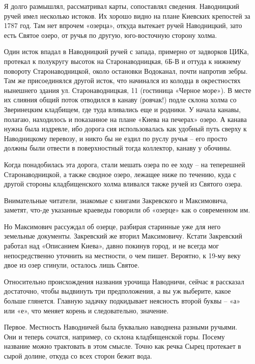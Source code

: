 Я долго размышлял, рассматривал карты, сопоставлял сведения. Наводницкий ручей имел несколько истоков. Их хорошо видно на плане Киевских крепостей за 1787 год. Там нет впрочем «озерца», откуда вытекает ручей Наводницкий, зато есть Святое озеро, от ручья по другую, юго-восточную сторону холма.

Один исток впадал в Наводницкий ручей с запада, примерно от задворков ЦИКа, протекал к полукругу высоток на Старонаводницкая, 6Б-В и оттуда к нижнему повороту Старонаводницкой, около остановки Водоканал, почти напротив зебры. Там же присоединялся другой исток, что начинался из колодца в окрестностях нынешнего здания ул. Старонаводницкая, 11 (гостиница «Черное море»). В месте их слияния общий поток отводился в канаву (ровчак!) подле склона холма со Зверинецким кладбищем, где туда вливались еще и родники. У начала канавы, полагаю, находилось и показанное на плане «Киева на печерах» озеро. А канава нужна была издревле, ибо дорога сия использовалась как удобный путь сверху к Наводницкому перевозу, и никто бы не ездил по руслу ручья – его просто должны были отвести в поверхностный тогда коллектор, канаву у обочины.

Когда понадобилась эта дорога, стали мешать озера по ее ходу – на теперешней Старонаводницкой, а также сводное озеро, лежащее ниже по течению, куда с другой стороны кладбищенского холма вливался также ручей из Святого озера.

Внимательные читатели, знакомые с книгами Закревского и Максимовича, заметят, что-де указанные краеведы говорили об «озерце» как о современном им. 

Но Максимович рассуждал об озерце, разбирая старинные уже для него земельные документы. Закревский же вторил Максимовичу. Кстати Закревский работал над «Описанием Киева», давно покинув город, и не всегда мог непосредственно уточнить на местности, о чем пишет. Вероятно, к 19-му веку двое из озер сгинули, осталось лишь Святое.

Относительно происхождения названия урочища Наводничи, сейчас я рассказал достаточно, чтобы выдвинуть три предположения, а вы уж выберите, какое больше глянется. Главную задачку подкидывает неясность второй буквы – «а» или «е», что меняет корень и следовательно, значение.

Первое. Местность Наводничей была буквально наводнена разными ручьями. Они и теперь сочатся, например, со склона кладбищенской горы. Посему название можно трактовать в этом смысле. Точно как речка Сырец протекает в сырой долине, откуда со всех сторон бежит вода.

